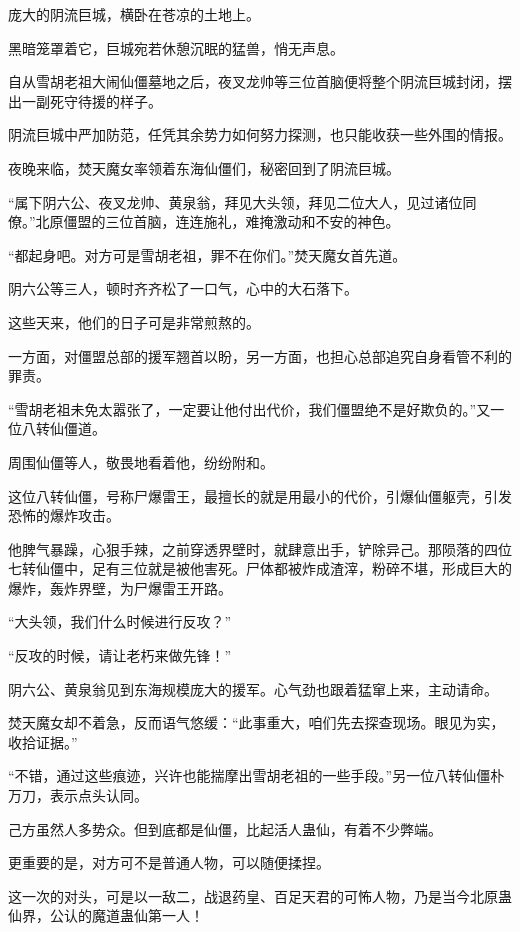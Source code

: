 
\begin{this_body}

庞大的阴流巨城，横卧在苍凉的土地上。

黑暗笼罩着它，巨城宛若休憩沉眠的猛兽，悄无声息。

自从雪胡老祖大闹仙僵墓地之后，夜叉龙帅等三位首脑便将整个阴流巨城封闭，摆出一副死守待援的样子。

阴流巨城中严加防范，任凭其余势力如何努力探测，也只能收获一些外围的情报。

夜晚来临，焚天魔女率领着东海仙僵们，秘密回到了阴流巨城。

“属下阴六公、夜叉龙帅、黄泉翁，拜见大头领，拜见二位大人，见过诸位同僚。”北原僵盟的三位首脑，连连施礼，难掩激动和不安的神色。

“都起身吧。对方可是雪胡老祖，罪不在你们。”焚天魔女首先道。

阴六公等三人，顿时齐齐松了一口气，心中的大石落下。

这些天来，他们的日子可是非常煎熬的。

一方面，对僵盟总部的援军翘首以盼，另一方面，也担心总部追究自身看管不利的罪责。

“雪胡老祖未免太嚣张了，一定要让他付出代价，我们僵盟绝不是好欺负的。”又一位八转仙僵道。

周围仙僵等人，敬畏地看着他，纷纷附和。

这位八转仙僵，号称尸爆雷王，最擅长的就是用最小的代价，引爆仙僵躯壳，引发恐怖的爆炸攻击。

他脾气暴躁，心狠手辣，之前穿透界壁时，就肆意出手，铲除异己。那陨落的四位七转仙僵中，足有三位就是被他害死。尸体都被炸成渣滓，粉碎不堪，形成巨大的爆炸，轰炸界壁，为尸爆雷王开路。

“大头领，我们什么时候进行反攻？”

“反攻的时候，请让老朽来做先锋！”

阴六公、黄泉翁见到东海规模庞大的援军。心气劲也跟着猛窜上来，主动请命。

焚天魔女却不着急，反而语气悠缓：“此事重大，咱们先去探查现场。眼见为实，收拾证据。”

“不错，通过这些痕迹，兴许也能揣摩出雪胡老祖的一些手段。”另一位八转仙僵朴万刀，表示点头认同。

己方虽然人多势众。但到底都是仙僵，比起活人蛊仙，有着不少弊端。

更重要的是，对方可不是普通人物，可以随便揉捏。

这一次的对头，可是以一敌二，战退药皇、百足天君的可怖人物，乃是当今北原蛊仙界，公认的魔道蛊仙第一人！


\end{this_body}
